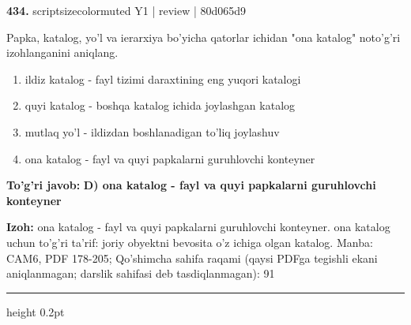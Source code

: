 \documentclass[10pt,a4paper]{article}
\begin{document}
{\bfseries\sffamily\color{ink} 434.} {scriptsizecolor{muted} Y1 | review | 80d065d9}
\par
Papka, katalog, yo'l va ierarxiya bo'yicha qatorlar ichidan "ona katalog" noto'g'ri izohlanganini aniqlang.
\begin{enumerate}[label=\Alph*),leftmargin=9mm]
\item ildiz katalog - fayl tizimi daraxtining eng yuqori katalogi
\item quyi katalog - boshqa katalog ichida joylashgan katalog
\item mutlaq yo'l - ildizdan boshlanadigan to'liq joylashuv
\item ona katalog - fayl va quyi papkalarni guruhlovchi konteyner
\end{enumerate}
\begin{tcolorbox}[enhanced,breakable,colback=teal!4,colframe=teal!60!black,boxrule=0.45pt,arc=1.2mm,left=2.7mm,right=2.7mm,top=1.8mm,bottom=1.8mm,before skip=2mm,after skip=2mm]
{\bfseries\sffamily\color{teal}To'g'ri javob:} \textbf{D) ona katalog - fayl va quyi papkalarni guruhlovchi konteyner}
\par\smallskip
{\bfseries Izoh:} ona katalog - fayl va quyi papkalarni guruhlovchi konteyner. ona katalog uchun to'g'ri ta'rif: joriy obyektni bevosita o'z ichiga olgan katalog. Manba: CAM6, PDF 178-205; Qo'shimcha sahifa raqami (qaysi PDFga tegishli ekani aniqlanmagan; darslik sahifasi deb tasdiqlanmagan): 91
\end{tcolorbox}
\vspace{2mm}\hrule height 0.2pt\vspace{3mm}
\end{document}
